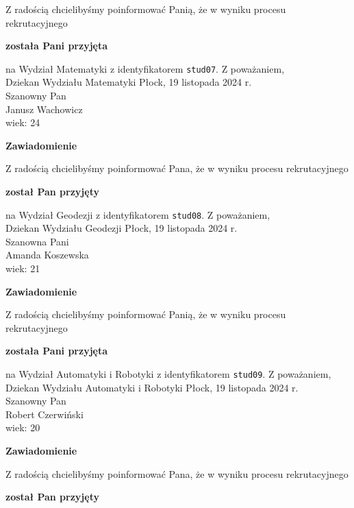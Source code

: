 \documentclass[12pt,a4paper]{article}
\begin{document}
\bigskip 
Z radością chcielibyśmy poinformować Panią, że w wyniku procesu rekrutacyjnego
\begin{center}
\textsf{\textbf{została Pani przyjęta}}
\end{center}
na Wydział Matematyki z identyfikatorem \verb|stud07|. 
\vspace{2cm}
\noindent
Z poważaniem, \\
Dziekan
Wydziału Matematyki
\newpage
\hfill Płock, 19 listopada 2024 r. \\
\noindent
Szanowny Pan \\
Janusz Wachowicz \\
wiek: 24
\bigskip
\begin{center}
    {\Large\textbf{Zawiadomienie}}
\end{center}
\bigskip 
Z radością chcielibyśmy poinformować Pana, że w wyniku procesu rekrutacyjnego
\begin{center}
\textsf{\textbf{został Pan przyjęty}}
\end{center}
na Wydział Geodezji z identyfikatorem \verb|stud08|. 
\vspace{2cm}
\noindent
Z poważaniem, \\
Dziekan
Wydziału Geodezji
\newpage
\hfill Płock, 19 listopada 2024 r. \\
\noindent
Szanowna Pani \\
Amanda Koszewska \\
wiek: 21
\bigskip
\begin{center}
    {\Large\textbf{Zawiadomienie}}
\end{center}
\bigskip 
Z radością chcielibyśmy poinformować Panią, że w wyniku procesu rekrutacyjnego
\begin{center}
\textsf{\textbf{została Pani przyjęta}}
\end{center}
na Wydział Automatyki i Robotyki z identyfikatorem \verb|stud09|. 
\vspace{2cm}
\noindent
Z poważaniem, \\
Dziekan
Wydziału Automatyki i Robotyki
\newpage
\hfill Płock, 19 listopada 2024 r. \\
\noindent
Szanowny Pan \\
Robert Czerwiński \\
wiek: 20
\bigskip
\begin{center}
    {\Large\textbf{Zawiadomienie}}
\end{center}
\bigskip 
Z radością chcielibyśmy poinformować Pana, że w wyniku procesu rekrutacyjnego
\begin{center}
\textsf{\textbf{został Pan przyjęty}}
\end{center}
\end{document}
